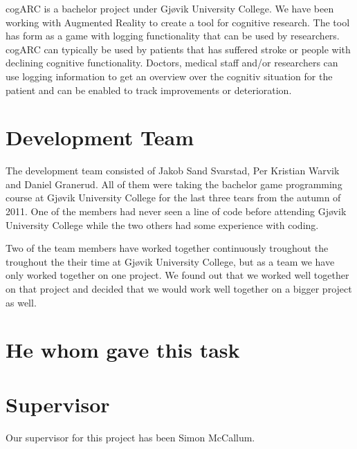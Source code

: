cogARC is a bachelor project under Gj\o vik University College. We have been
working with \gls{Augmented Reality} to create a tool for cognitive research.
The tool has form as a game with logging functionality that can be used by
researchers. cogARC can typically be used by patients that has suffered stroke
or people with declining cognitive functionality. Doctors, medical staff and/or
researchers can use logging information to get an overview over the cognitiv
situation for the patient and can be enabled to track improvements or
deterioration.

\cite{GenVirtual}

\section{Development Team}
The development team consisted of Jakob Sand Svarstad, Per Kristian Warvik and Daniel Granerud.
All of them were taking the bachelor game programming course at Gj\o vik University College for the last three tears from the autumn of 2011. One of the members had never seen a line of code before attending Gj\o vik University College while the two others had some experience with coding.

Two of the team members have worked together continuously troughout the  troughout the their time at Gj\o vik University College, but as a team we have only worked together on one project. We found out that we worked well together on that project and decided that we would work well together on a bigger project as well.

\section{He whom gave this task}


\section{Supervisor}
Our supervisor for this project has been Simon McCallum.

